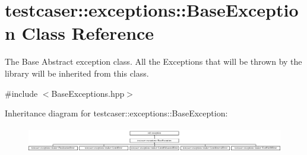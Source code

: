\hypertarget{classtestcaser_1_1exceptions_1_1BaseException}{}\section{testcaser\+:\+:exceptions\+:\+:Base\+Exception Class Reference}
\label{classtestcaser_1_1exceptions_1_1BaseException}


The Base Abstract exception class. All the Exceptions that will be thrown by the library will be inherited from this class.  




{\ttfamily \#include $<$Base\+Exceptions.\+hpp$>$}

Inheritance diagram for testcaser\+:\+:exceptions\+:\+:Base\+Exception\+:\begin{figure}[H]
\begin{center}
\leavevmode
\includegraphics[height=1.135135cm]{classtestcaser_1_1exceptions_1_1BaseException}
\end{center}
\end{figure}
